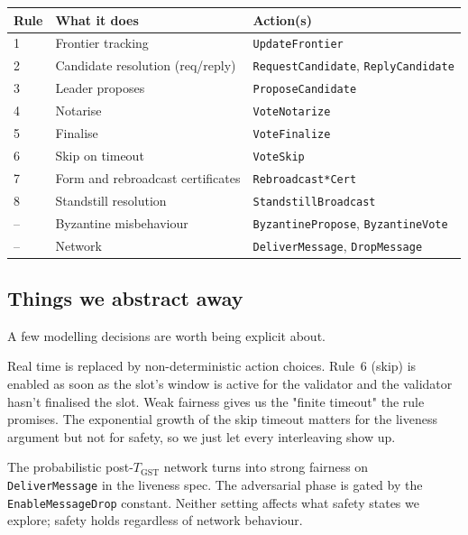 \documentclass[11pt,a4paper]{article}
\begin{document}
\begin{center}
\begin{tabular}{lll}
\toprule
Rule  & What it does                                         & Action(s) \\
\midrule
1     & Frontier tracking                                   & \texttt{UpdateFrontier} \\
2     & Candidate resolution (req/reply)                    & \texttt{RequestCandidate}, \texttt{ReplyCandidate} \\
3     & Leader proposes                                     & \texttt{ProposeCandidate} \\
4     & Notarise                                            & \texttt{VoteNotarize} \\
5     & Finalise                                            & \texttt{VoteFinalize} \\
6     & Skip on timeout                                     & \texttt{VoteSkip} \\
7     & Form and rebroadcast certificates                   & \texttt{Rebroadcast*Cert} \\
8     & Standstill resolution                               & \texttt{StandstillBroadcast} \\
--    & Byzantine misbehaviour                              & \texttt{ByzantinePropose}, \texttt{ByzantineVote} \\
--    & Network                                             & \texttt{DeliverMessage}, \texttt{DropMessage} \\
\bottomrule
\end{tabular}
\end{center}

\subsection{Things we abstract away}

A few modelling decisions are worth being explicit about.

Real time is replaced by non-deterministic action choices. Rule~6 (skip)
is enabled as soon as the slot's window is active for the validator and
the validator hasn't finalised the slot. Weak fairness gives us the
"finite timeout" the rule promises. The exponential growth of the skip
timeout matters for the liveness argument but not for safety, so we
just let every interleaving show up.

The probabilistic post-$T_\mathrm{GST}$ network turns into strong
fairness on \verb|DeliverMessage| in the liveness spec. The adversarial
phase is gated by the \verb|EnableMessageDrop| constant. Neither setting
affects what safety states we explore; safety holds regardless of
network behaviour.
\end{document}
